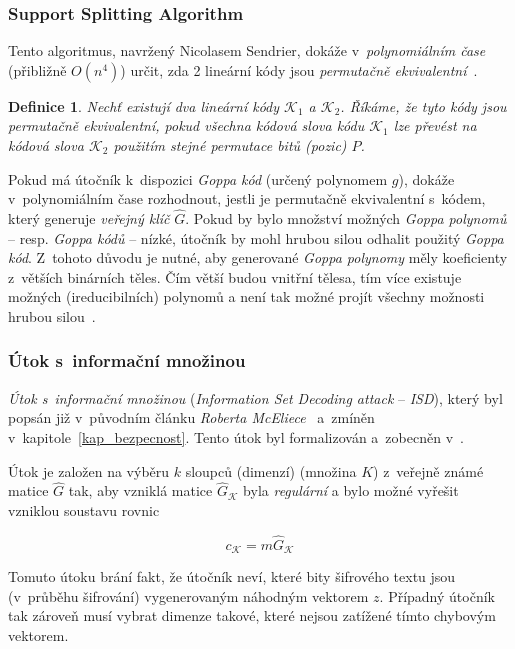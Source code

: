 \documentclass[thesis=M,czech,hidelinks]{FITthesis}[2012/06/26]
\newcommand{\0}{{\textcolor[gray]{0.80}{0}}}
\newtheorem{definice}{Definice}
\begin{document}
\subsubsection{Support Splitting Algorithm}
Tento algoritmus, navržený Nicolasem Sendrier, dokáže v~\emph{polynomiálním
čase} (přibližně $O(n^4)$) určit, zda 2 lineární kódy jsou
\emph{permutačně ekvivalentní}~\cite{Sendrier}.

\begin{definice}
    Nechť existují dva lineární kódy $\mathcal{K}_1$ a $\mathcal{K}_2$. Říkáme,
    že tyto kódy jsou \emph{permutačně ekvivalentní}, pokud všechna kódová slova
    kódu $\mathcal{K}_1$ lze převést na kódová slova $\mathcal{K}_2$ použitím
    stejné permutace bitů (pozic) $P$.
\end{definice}

Pokud má útočník k~dispozici \emph{Goppa kód} (určený polynomem $g$), dokáže
v~polynomiálním čase rozhodnout, jestli je permutačně ekvivalentní s~kódem, který
generuje \emph{veřejný klíč} $\hat{G}$. Pokud by bylo množství možných
\emph{Goppa polynomů} -- resp. \emph{Goppa kódů} -- nízké, útočník by mohl
hrubou silou odhalit použitý \emph{Goppa kód}. Z~tohoto důvodu je nutné, aby
generované \emph{Goppa polynomy} měly koeficienty z~větších binárních těles. Čím
větší budou vnitřní tělesa, tím více existuje možných (ireducibilních) polynomů
a není tak možné projít všechny možnosti hrubou silou~\cite{Repka}.

\subsubsection{Útok s~informační množinou}
\emph{Útok s~informační množinou} (\emph{Information Set Decoding attack} --
\emph{ISD}), který byl popsán již v~původním článku \emph{Roberta
McEliece}~\cite{McEliece} a~zmíněn v~kapitole~\ref{kap_bezpecnost}. Tento útok
byl formalizován a~zobecněn v~\cite{Lee}.

Útok je založen na výběru $k$ sloupců (dimenzí) (množina $K$) z~veřejně známé
matice $\hat{G}$ tak, aby vzniklá matice $\hat{G}_{\mathcal{K}}$ byla
\emph{regulární} a bylo možné vyřešit vzniklou soustavu rovnic

$$ c_{\mathcal{K}} = m \hat{G}_{\mathcal{K}} $$

Tomuto útoku brání fakt, že útočník neví, které bity šifrového textu jsou
(v~průběhu šifrování)  vygenerovaným náhodným vektorem $z$.
Případný útočník tak zároveň musí vybrat dimenze takové, které nejsou zatížené
tímto chybovým vektorem.
\end{document}
